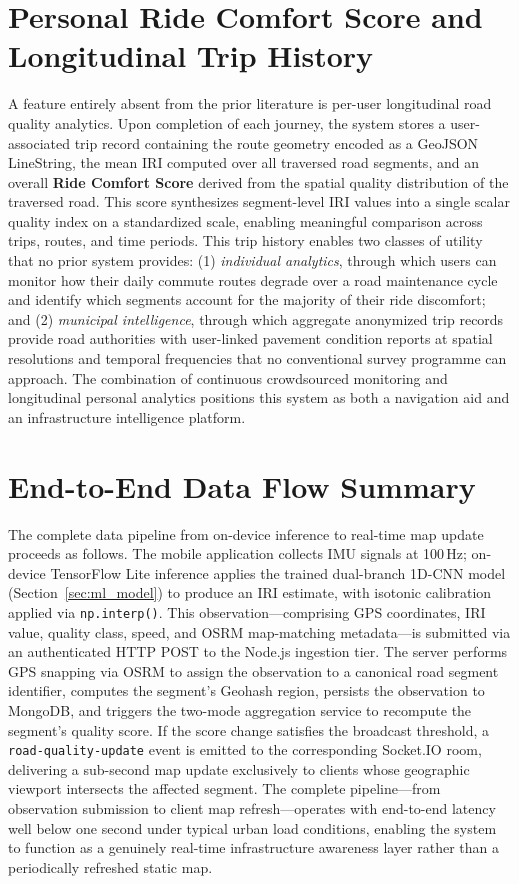 \documentclass[conference]{IEEEtran}
\begin{document}
\section{Personal Ride Comfort Score and Longitudinal Trip History}
A feature entirely absent from the prior literature is per-user longitudinal road quality analytics.
Upon completion of each journey, the system stores a user-associated trip record containing the route geometry encoded as a GeoJSON LineString, the mean IRI computed over all traversed road segments, and an overall \textbf{Ride Comfort Score} derived from the spatial quality distribution of the traversed road.
This score synthesizes segment-level IRI values into a single scalar quality index on a standardized scale, enabling meaningful comparison across trips, routes, and time periods.
This trip history enables two classes of utility that no prior system provides: (1) \textit{individual analytics}, through which users can monitor how their daily commute routes degrade over a road maintenance cycle and identify which segments account for the majority of their ride discomfort;
and (2) \textit{municipal intelligence}, through which aggregate anonymized trip records provide road authorities with user-linked pavement condition reports at spatial resolutions and temporal frequencies that no conventional survey programme can approach.
The combination of continuous crowdsourced monitoring and longitudinal personal analytics positions this system as both a navigation aid and an infrastructure intelligence platform.

\section{End-to-End Data Flow Summary}
The complete data pipeline from on-device inference to real-time map update proceeds as follows.
The mobile application collects IMU signals at 100\,Hz; on-device TensorFlow Lite inference applies the trained dual-branch 1D-CNN model (Section~\ref{sec:ml_model}) to produce an IRI estimate, with isotonic calibration applied via \texttt{np.interp()}.
This observation---comprising GPS coordinates, IRI value, quality class, speed, and OSRM map-matching metadata---is submitted via an authenticated HTTP POST to the Node.js ingestion tier.
The server performs GPS snapping via OSRM to assign the observation to a canonical road segment identifier, computes the segment's Geohash region, persists the observation to MongoDB, and triggers the two-mode aggregation service to recompute the segment's quality score.
If the score change satisfies the broadcast threshold, a \texttt{road-quality-update} event is emitted to the corresponding Socket.IO room, delivering a sub-second map update exclusively to clients whose geographic viewport intersects the affected segment.
The complete pipeline---from observation submission to client map refresh---operates with end-to-end latency well below one second under typical urban load conditions, enabling the system to function as a genuinely real-time infrastructure awareness layer rather than a periodically refreshed static map.
\end{document}
